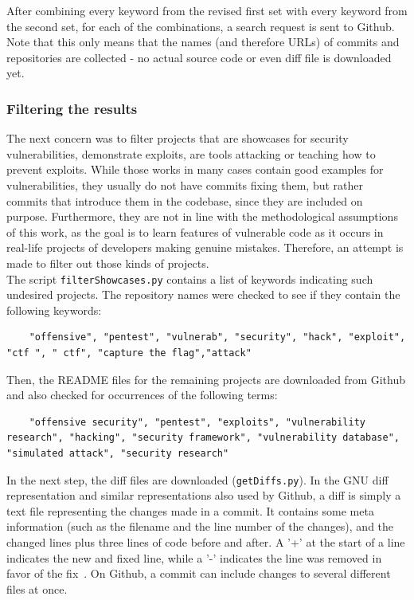 \documentclass[
a4paper,
pagesize,
pdftex,
12pt,
ngerman,
fleqn,
final,
]{scrartcl}
\begin{document}
	
	
	After combining every keyword from the revised first set with every keyword from the second set, for each of the combinations, a search request is sent to Github.
	Note that this only means that the names (and therefore URLs) of commits and repositories are collected - no actual source code or even diff file is downloaded yet.
	
	
	
	\subsubsection{Filtering the results}
	
	The next concern was to filter projects that are showcases for security vulnerabilities, demonstrate exploits, are tools attacking or teaching how to prevent exploits. While those works in many cases contain good examples for vulnerabilities, they usually do not have commits fixing them, but rather commits that introduce them in the codebase, since they are included on purpose. Furthermore, they are not in line with the methodological assumptions of this work, as the goal is to learn features of vulnerable code as it occurs in real-life projects of developers making genuine mistakes. Therefore, an attempt is made to filter out those kinds of projects.\\
	The script \texttt{filterShowcases.py} contains a list of keywords indicating such undesired projects. The repository names were checked to see if they contain the following keywords:
	\begin{lstlisting}
	"offensive", "pentest", "vulnerab", "security", "hack", "exploit", "ctf ", " ctf", "capture the flag","attack"
	\end{lstlisting}
	Then, the README files for the remaining projects are downloaded from Github and also checked for occurrences of the following terms:
	\begin{lstlisting}
	"offensive security", "pentest", "exploits", "vulnerability research", "hacking", "security framework", "vulnerability database", "simulated attack", "security research"
	\end{lstlisting}
	In the next step, the diff files are downloaded (\texttt{getDiffs.py}). In the GNU diff representation and similar representations also used by Github, a diff is simply a text file representing the changes made in a commit. It contains some meta information (such as the filename and the line number of the changes), and the changed lines plus three lines of code before and after. A '+' at the start of a line indicates the new and fixed line, while a '-' indicates the line was removed in favor of the fix~\cite{Liu.2018}. On Github, a commit can include changes to several different files at once.\\
\end{document}
